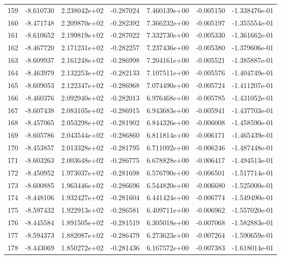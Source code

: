 \begin{tabular}{rrrrrrr}
 159 &  -8.610730 &  2.238042e+02 & -0.287024 &  7.460139e+00 &  -0.005150 & -1.338476e-01 \\
 160 &  -8.471748 &  2.209870e+02 & -0.282392 &  7.366232e+00 &  -0.005197 & -1.355554e-01 \\
 161 &  -8.610652 &  2.199819e+02 & -0.287022 &  7.332730e+00 &  -0.005330 & -1.361662e-01 \\
 162 &  -8.467720 &  2.171231e+02 & -0.282257 &  7.237436e+00 &  -0.005380 & -1.379606e-01 \\
 163 &  -8.609937 &  2.161248e+02 & -0.286998 &  7.204161e+00 &  -0.005521 & -1.385887e-01 \\
 164 &  -8.463979 &  2.132253e+02 & -0.282133 &  7.107511e+00 &  -0.005576 & -1.404749e-01 \\
 165 &  -8.609053 &  2.122347e+02 & -0.286968 &  7.074490e+00 &  -0.005724 & -1.411207e-01 \\
 166 &  -8.460376 &  2.092940e+02 & -0.282013 &  6.976468e+00 &  -0.005785 & -1.431052e-01 \\
 167 &  -8.607438 &  2.083105e+02 & -0.286915 &  6.943683e+00 &  -0.005941 & -1.437703e-01 \\
 168 &  -8.457065 &  2.053298e+02 & -0.281902 &  6.844326e+00 &  -0.006008 & -1.458590e-01 \\
 169 &  -8.605786 &  2.043544e+02 & -0.286860 &  6.811814e+00 &  -0.006171 & -1.465439e-01 \\
 170 &  -8.453857 &  2.013328e+02 & -0.281795 &  6.711092e+00 &  -0.006246 & -1.487448e-01 \\
 171 &  -8.603263 &  2.003648e+02 & -0.286775 &  6.678828e+00 &  -0.006417 & -1.494513e-01 \\
 172 &  -8.450952 &  1.973037e+02 & -0.281698 &  6.576790e+00 &  -0.006501 & -1.517714e-01 \\
 173 &  -8.600885 &  1.963446e+02 & -0.286696 &  6.544820e+00 &  -0.006680 & -1.525000e-01 \\
 174 &  -8.448106 &  1.932427e+02 & -0.281604 &  6.441424e+00 &  -0.006774 & -1.549490e-01 \\
 175 &  -8.597432 &  1.922913e+02 & -0.286581 &  6.409711e+00 &  -0.006962 & -1.557020e-01 \\
 176 &  -8.445584 &  1.891505e+02 & -0.281519 &  6.305018e+00 &  -0.007068 & -1.582883e-01 \\
 177 &  -8.594373 &  1.882087e+02 & -0.286479 &  6.273623e+00 &  -0.007264 & -1.590659e-01 \\
 178 &  -8.443069 &  1.850272e+02 & -0.281436 &  6.167572e+00 &  -0.007383 & -1.618014e-01 \\

\end{tabular}
